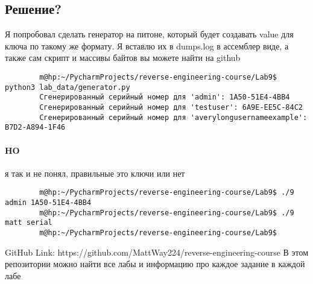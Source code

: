     \subsection*{Решение?}
    Я попробовал сделать генератор на питоне, который будет создавать value для ключа по такому же формату.
    Я вставлю их в dumps.log в ассемблер виде, а также сам скрипт и массивы байтов вы можете найти на github
    \begin{verbatim}
        m@hp:~/PycharmProjects/reverse-engineering-course/Lab9$ python3 lab_data/generator.py
        Сгенерированный серийный номер для 'admin': 1A50-51E4-4BB4
        Сгенерированный серийный номер для 'testuser': 6A9E-EE5C-84C2
        Сгенерированный серийный номер для 'averylongusernameexample': B7D2-A894-1F46

    \end{verbatim}

    \paragraph{HO}
    я так и не понял, правильные это ключи или нет
    \begin{verbatim}
        m@hp:~/PycharmProjects/reverse-engineering-course/Lab9$ ./9 admin 1A50-51E4-4BB4
        m@hp:~/PycharmProjects/reverse-engineering-course/Lab9$ ./9 matt serial
        m@hp:~/PycharmProjects/reverse-engineering-course/Lab9$
    \end{verbatim}

    \begin{thebibliography}{1}
        GitHub Link: https://github.com/MattWay224/reverse-engineering-course
        В этом репозитории можно найти все лабы и информацию про каждое задание в каждой лабе
    \end{thebibliography}

